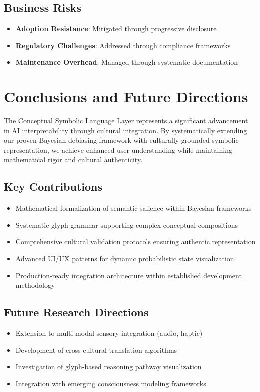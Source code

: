 \documentclass[12pt]{article}
\begin{document}
\subsection{Business Risks}
\begin{itemize}
    \item \textbf{Adoption Resistance}: Mitigated through progressive disclosure
    \item \textbf{Regulatory Challenges}: Addressed through compliance frameworks
    \item \textbf{Maintenance Overhead}: Managed through systematic documentation
\end{itemize}

\section{Conclusions and Future Directions}

The Conceptual Symbolic Language Layer represents a significant advancement in AI interpretability through cultural integration. By systematically extending our proven Bayesian debiasing framework with culturally-grounded symbolic representation, we achieve enhanced user understanding while maintaining mathematical rigor and cultural authenticity.

\subsection{Key Contributions}
\begin{itemize}
    \item Mathematical formalization of semantic salience within Bayesian frameworks
    \item Systematic glyph grammar supporting complex conceptual compositions
    \item Comprehensive cultural validation protocols ensuring authentic representation
    \item Advanced UI/UX patterns for dynamic probabilistic state visualization
    \item Production-ready integration architecture within established development methodology
\end{itemize}

\subsection{Future Research Directions}
\begin{itemize}
    \item Extension to multi-modal sensory integration (audio, haptic)
    \item Development of cross-cultural translation algorithms
    \item Investigation of glyph-based reasoning pathway visualization
    \item Integration with emerging consciousness modeling frameworks
\end{itemize}
\end{document}
